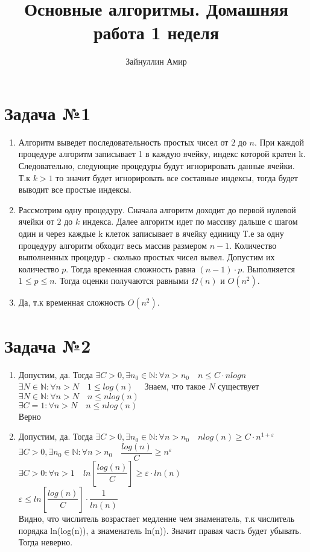 \documentclass[a4paper,12pt]{article}
\title{\textbf{Основные алгоритмы. Домашняя работа 1 неделя}}
\author{Зайнуллин Амир}
\begin{document}
\maketitle

\section*{Задача №1}
\begin{enumerate}
  \item Алгоритм выведет последовательность простых чисел от $2$ до $n$. При каждой процедуре алгоритм записывает 1 в каждую ячейку, 
  индекс которой кратен k. Следовательно, следующие процедуры будут игнорировать данные ячейки. Т.к $k > 1$ то значит будет игнорировать все составные индексы, тогда будет выводит все простые индексы.
  \item Рассмотрим одну процедуру. Сначала алгоритм доходит до первой нулевой ячейки от $2$ до $k$ индекса. Далее алгоритм идет по массиву дальше с шагом один и через каждые k клеток записывает в ячейку единицу Т.е за одну процедуру алгоритм обходит весь массив размером $n - 1$. Количество выполненных процедур - сколько простых чисел вывел. Допустим их количество $p$. Тогда временная сложность равна $(n - 1) \cdot p$. Выполняется $1 \leq p \leq  n$. Тогда оценки получаются равными $\Omega(n) \text{ и } O(n^2)$.
  \item Да, т.к временная сложность $O(n^2)$.
\end{enumerate}

\section*{Задача №2}
\begin{enumerate}
  \item Допустим, да. Тогда $\exists C > 0, \exists n_0 \in \mathbb{N}: \forall n > n_0 \quad n \leqslant C \cdot n logn$ \\
  $\exists N \in \mathbb{N}: \forall n > N \quad 1 \leqslant log(n) \quad$  Знаем, что такое $N$ существует\\
  $\exists N \in \mathbb{N}: \forall n > N \quad n \leqslant nlog(n)$ \\
  $\exists C = 1: \forall n > N \quad n \leqslant n log(n)$ \\ 
  Верно
  \item Допустим, да. Тогда $\exists C > 0, \exists n_0 \in \mathbb{N}: \forall n > n_0 \quad nlog(n) \geqslant C \cdot n^{1 + \varepsilon}$ \\
  $\exists C > 0, \exists n_0 \in \mathbb{N}: \forall n > n_0 \quad \dfrac{log(n)}{C} \geqslant n^{\varepsilon}$ \\
  $\exists C > 0: \forall n > 1 \quad ln\left[\dfrac{log(n)}{C}\right] \geqslant {\varepsilon} \cdot ln(n)$ \\
  $\varepsilon \leqslant ln\left[\dfrac{log(n)}{C}\right] \cdot \dfrac{1}{ln(n)}$ \\
  Видно, что числитель возрастает медленне чем знаменатель, т.к числитель порядка ln(log(n)), а знаменатель ln(n)). Значит правая часть будет убывать. Тогда неверно.
\end{enumerate}
\end{document}
